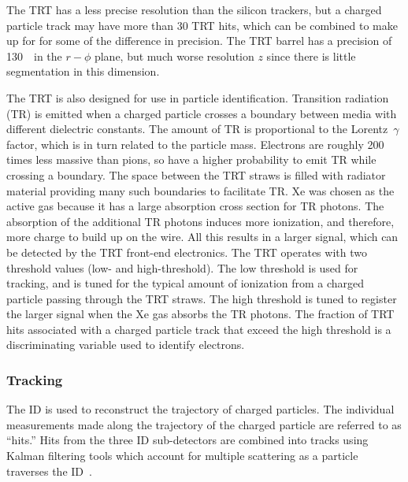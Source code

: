 The TRT has a less precise resolution than the silicon trackers, but a charged
particle track may have more than 30 TRT hits, which can be combined to make
up for for some of the difference in precision.
The TRT barrel has a precision of 130~\um\  in the $r-\phi$ plane, but much
worse resolution $z$ since there is little segmentation in this dimension.

The TRT is also designed for use in particle identification.
Transition radiation (TR) is emitted when a charged particle crosses a boundary
between media with different dielectric constants.
The amount of TR is proportional to the Lorentz~$\gamma$ factor, which is in
turn related to the particle mass.
Electrons are roughly 200 times less massive than pions, so have a higher
probability to emit TR while crossing a boundary.
The space between the TRT straws is filled with radiator material providing
many such boundaries to facilitate TR.
Xe was chosen as the active gas because it has a large absorption cross section
for TR photons.
The absorption of the additional TR photons induces more ionization, and
therefore, more charge to build up on the wire.
All this results in a larger signal, which can be detected by the TRT
front-end electronics.
The TRT operates with two threshold values (low- and high-threshold).
The low threshold is used for tracking, and is tuned for the typical amount of
ionization from a charged particle passing through the TRT straws.
The high threshold is tuned to register the larger signal when the Xe gas
absorbs the TR photons.
The fraction of TRT hits associated with a charged particle track that exceed
the high threshold is a discriminating variable used to identify electrons.

\FloatBarrier
\subsubsection{Tracking} 
\label{sec:tracking}

The ID is used to reconstruct the trajectory of charged particles.
The individual measurements made along the trajectory of the charged particle
are referred to as ``hits.''
Hits from the three ID sub-detectors are combined into tracks using Kalman
filtering tools which account for multiple scattering as a particle traverses
the ID~\cite{ATLAS-CONF-2014-047,ATLAS-CONF-2012-042}.

